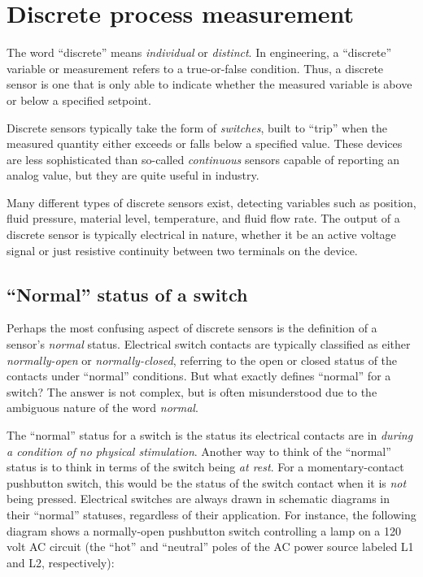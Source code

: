 
\chapter{Discrete process measurement}

\label{Process_switches}

The word ``discrete'' means \textit{individual} or \textit{distinct}.  In engineering, a ``discrete'' variable or measurement refers to a true-or-false condition.  Thus, a discrete sensor is one that is only able to indicate whether the measured variable is above or below a specified setpoint. 

Discrete sensors typically take the form of \textit{switches}, built to ``trip'' when the measured quantity either exceeds or falls below a specified value.  These devices are less sophisticated than so-called \textit{continuous} sensors capable of reporting an analog value, but they are quite useful in industry. 

Many different types of discrete sensors exist, detecting variables such as position, fluid pressure, material level, temperature, and fluid flow rate.  The output of a discrete sensor is typically electrical in nature, whether it be an active voltage signal or just resistive continuity between two terminals on the device.








\filbreak
\section{``Normal'' status of a switch}

\label{normal_switch}

Perhaps the most confusing aspect of discrete sensors is the definition of a sensor's \textit{normal} status.  Electrical switch contacts are typically classified as either \textit{normally-open} or \textit{normally-closed}, referring to the open or closed status of the contacts under ``normal'' conditions.  But what exactly defines ``normal'' for a switch?  The answer is not complex, but is often misunderstood due to the ambiguous nature of the word \textit{normal}.  

The ``normal'' status for a switch is the status its electrical contacts are in \textit{during a condition of no physical stimulation}.  Another way to think of the ``normal'' status is to think in terms of the switch being \textit{at rest}.  For a momentary-contact pushbutton switch, this would be the status of the switch contact when it is \textit{not} being pressed.  Electrical switches are always drawn in schematic diagrams in their ``normal'' statuses, regardless of their application.  For instance, the following diagram shows a normally-open pushbutton switch controlling a lamp on a 120 volt AC circuit (the ``hot'' and ``neutral'' poles of the AC power source labeled L1 and L2, respectively):

